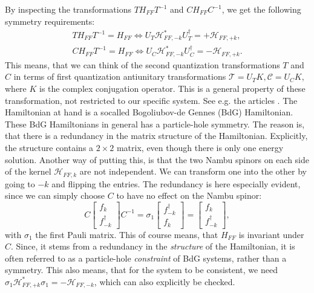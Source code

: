By inspecting the transformations $TH_{FF}T^{-1}$ and $CH_{FF}C^{-1}$, we get the following symmetry requirements:
\begin{align}
TH_{FF}T^{-1} = H_{FF} \Leftrightarrow U_T\mathcal{H}^*_{FF,-k} U^\dagger_T = + \mathcal{H}_{FF,+k}, \nonumber \\
CH_{FF}T^{-1} = H_{FF} \Leftrightarrow U_C\mathcal{H}^*_{FF,-k} U^\dagger_C = - \mathcal{H}_{FF,+k}. 
\label{eq.Symmetryrequirements}
\end{align}
This means, that we can think of the second quantization transformations $T$ and $C$ in terms of first quantization antiunitary transformations $\mathcal{T} = U_TK, \mathcal{C} = U_CK$, where $K$ is the complex conjugation operator. This is a general property of these transformation, not restricted to our specific system. See e.g. the articles \cite{Ludwig.Topology, Chiu.Topology}. The Hamiltonian at hand is a socalled Bogoliubov-de Gennes (BdG) Hamiltonian. These BdG Hamiltonians in general has a particle-hole symmetry. The reason is, that there is a redundancy in the matrix structure of the Hamiltonian. Explicitly, the structure contains a $2\times 2$ matrix, even though there is only one energy solution. Another way of putting this, is that the two Nambu spinors on each side of the kernel $\mathcal{H}_{FF,k}$ are not independent. We can transform one into the other by going to $-k$ and flipping the entries. The redundancy is here especially evident, since we can simply choose $C$ to have no effect on the Nambu spinor:
\begin{equation}
C \begin{bmatrix} f_k \\ f^\dagger_{-k} \end{bmatrix} C^{-1} =  \sigma_1 \begin{bmatrix} f^\dagger_{-k} \\ f_{k} \end{bmatrix} = \begin{bmatrix} f_k \\ f^\dagger_{-k} \end{bmatrix}, 
\end{equation}
with $\sigma_1$ the first Pauli matrix. This of course means, that $H_{FF}$ is invariant under $C$. Since, it stems from a redundancy in the \textit{structure} of the Hamiltonian, it is often referred to as a particle-hole \textit{constraint} of BdG systems, rather than a symmetry. This also means, that for the system to be consistent, we need $\sigma_1\mathcal{H}^*_{FF,+k} \sigma_1 = - \mathcal{H}_{FF,-k}$, which can also explicitly be checked. 

